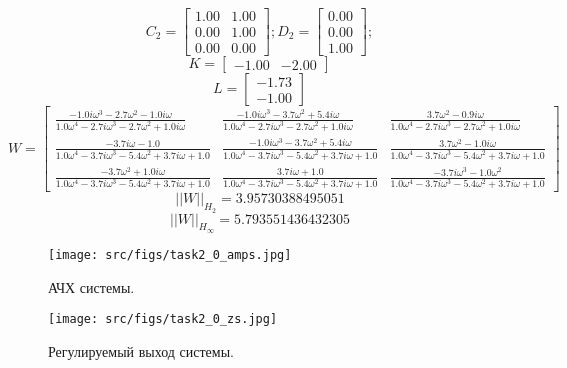 
\[C_2 = \begin{bmatrix}
    1.00 &  1.00\\
    0.00 &  1.00\\
    0.00 &  0.00
  \end{bmatrix}; D_2 = \begin{bmatrix}
    0.00\\
    0.00\\
    1.00
  \end{bmatrix};\]
  \[K = \begin{bmatrix}
   -1.00 & -2.00
  \end{bmatrix}\]
  \[L = \begin{bmatrix}
   -1.73\\
   -1.00
  \end{bmatrix}\]
  \[W = \left[\begin{matrix}\frac{- 1.0 i \omega^{3} - 2.7 \omega^{2} - 1.0 i \omega}{1.0 \omega^{4} - 2.7 i \omega^{3} - 2.7 \omega^{2} + 1.0 i \omega} & \frac{- 1.0 i \omega^{3} - 3.7 \omega^{2} + 5.4 i \omega}{1.0 \omega^{4} - 2.7 i \omega^{3} - 2.7 \omega^{2} + 1.0 i \omega} & \frac{3.7 \omega^{2} - 0.9 i \omega}{1.0 \omega^{4} - 2.7 i \omega^{3} - 2.7 \omega^{2} + 1.0 i \omega}\\\frac{- 3.7 i \omega - 1.0}{1.0 \omega^{4} - 3.7 i \omega^{3} - 5.4 \omega^{2} + 3.7 i \omega + 1.0} & \frac{- 1.0 i \omega^{3} - 3.7 \omega^{2} + 5.4 i \omega}{1.0 \omega^{4} - 3.7 i \omega^{3} - 5.4 \omega^{2} + 3.7 i \omega + 1.0} & \frac{3.7 \omega^{2} - 1.0 i \omega}{1.0 \omega^{4} - 3.7 i \omega^{3} - 5.4 \omega^{2} + 3.7 i \omega + 1.0}\\\frac{- 3.7 \omega^{2} + 1.0 i \omega}{1.0 \omega^{4} - 3.7 i \omega^{3} - 5.4 \omega^{2} + 3.7 i \omega + 1.0} & \frac{3.7 i \omega + 1.0}{1.0 \omega^{4} - 3.7 i \omega^{3} - 5.4 \omega^{2} + 3.7 i \omega + 1.0} & \frac{- 3.7 i \omega^{3} - 1.0 \omega^{2}}{1.0 \omega^{4} - 3.7 i \omega^{3} - 5.4 \omega^{2} + 3.7 i \omega + 1.0}\end{matrix}\right]\]
  \[||W||_{H_2} = 3.95730388495051\]
  \[||W||_{H_\infty} = 5.793551436432305 \]

  \begin{figure}[ht!]
    \centering
    \texttt{[image: src/figs/task2\_0\_amps.jpg]}
    \caption{АЧХ системы.}
    \label{fig:task2_0_amps}
  \end{figure}
  
  \begin{figure}[ht!]
    \centering
    \texttt{[image: src/figs/task2\_0\_zs.jpg]}
    \caption{Регулируемый выход системы.}
    \label{fig:task2_0_zs}
  \end{figure}
  
